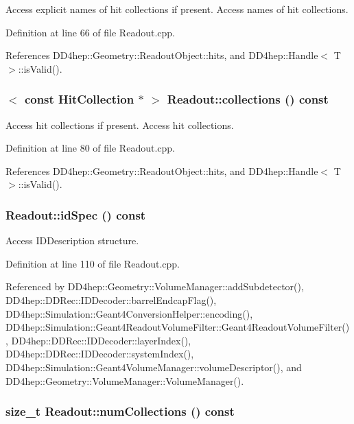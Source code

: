 Access explicit names of hit collections if present. Access names of hit collections. 

Definition at line 66 of file Readout.cpp.

References DD4hep::Geometry::ReadoutObject::hits, and DD4hep::Handle$<$ T $>$::isValid().\hypertarget{class_d_d4hep_1_1_geometry_1_1_readout_a2b32b65ef9314b2905205278a1b6135f}{
\subsubsection[{collections}]{$<$ const {\bf HitCollection} $\ast$ $>$ Readout::collections () const}}
\label{class_d_d4hep_1_1_geometry_1_1_readout_a2b32b65ef9314b2905205278a1b6135f}


Access hit collections if present. Access hit collections. 

Definition at line 80 of file Readout.cpp.

References DD4hep::Geometry::ReadoutObject::hits, and DD4hep::Handle$<$ T $>$::isValid().\hypertarget{class_d_d4hep_1_1_geometry_1_1_readout_a9db067ef343155e31bd6d526fbe4a0f6}{
\subsubsection[{idSpec}]{ Readout::idSpec () const}}
\label{class_d_d4hep_1_1_geometry_1_1_readout_a9db067ef343155e31bd6d526fbe4a0f6}


Access IDDescription structure. 

Definition at line 110 of file Readout.cpp.

Referenced by DD4hep::Geometry::VolumeManager::addSubdetector(), DD4hep::DDRec::IDDecoder::barrelEndcapFlag(), DD4hep::Simulation::Geant4ConversionHelper::encoding(), DD4hep::Simulation::Geant4ReadoutVolumeFilter::Geant4ReadoutVolumeFilter(), DD4hep::DDRec::IDDecoder::layerIndex(), DD4hep::DDRec::IDDecoder::systemIndex(), DD4hep::Simulation::Geant4VolumeManager::volumeDescriptor(), and DD4hep::Geometry::VolumeManager::VolumeManager().\hypertarget{class_d_d4hep_1_1_geometry_1_1_readout_aff0e1b36d7094da921d4a7b7db7a2709}{
\subsubsection[{numCollections}]{\setlength{\rightskip}{0pt plus 5cm}size\_\-t Readout::numCollections () const}}
\label{class_d_d4hep_1_1_geometry_1_1_readout_aff0e1b36d7094da921d4a7b7db7a2709}


